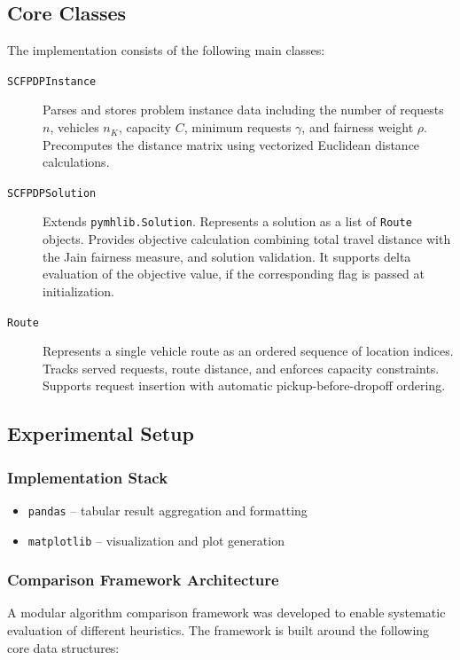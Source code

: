\documentclass[a4paper]{scrartcl}
\begin{document}
\subsection{Core Classes}\label{core_classes}
The implementation consists of the following main classes:

\begin{description}
  \item[\texttt{SCFPDPInstance}] Parses and stores problem instance data including the number of requests $n$, vehicles $n_K$, capacity $C$, minimum requests $\gamma$, and fairness weight $\rho$. Precomputes the distance matrix using vectorized Euclidean distance calculations.

  \item[\texttt{SCFPDPSolution}] Extends \texttt{pymhlib.Solution}. Represents a solution as a list of \texttt{Route} objects. Provides objective calculation combining total travel distance with the Jain fairness measure, and solution validation. It supports delta evaluation of the objective value, if the corresponding flag is passed at initialization.

  \item[\texttt{Route}] Represents a single vehicle route as an ordered sequence of location indices. Tracks served requests, route distance, and enforces capacity constraints. Supports request insertion with automatic pickup-before-dropoff ordering.
\end{description}

\subsection{Experimental Setup}

\subsubsection{Implementation Stack}
\begin{itemize}
  \item \texttt{pandas} -- tabular result aggregation and formatting
  \item \texttt{matplotlib} -- visualization and plot generation
\end{itemize}

\subsubsection{Comparison Framework Architecture}
A modular algorithm comparison framework was developed to enable systematic evaluation of different heuristics. The framework is built around the following core data structures:
\end{document}
